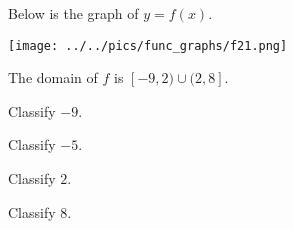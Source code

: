 \documentclass{ximera}
\author{Lee Wayand}
\begin{document}
\begin{exercise}  





Below is the graph of $y=f(x)$.  

\begin{image}
\texttt{[image: ../../pics/func\_graphs/f21.png]}
\end{image}


The domain of $f$ is $[-9, 2) \cup (2, 8]$.\\






\begin{question} 


Classify $-9$. \\


\begin{multipleChoice}
\end{multipleChoice}







Classify $-5$. \\


\begin{multipleChoice}
\end{multipleChoice}






Classify $2$. \\


\begin{multipleChoice}
\end{multipleChoice}




Classify $8$. \\


\begin{multipleChoice}
\end{multipleChoice}




\end{question}






\begin{question} 



\end{question}
\end{exercise}
\end{document}
